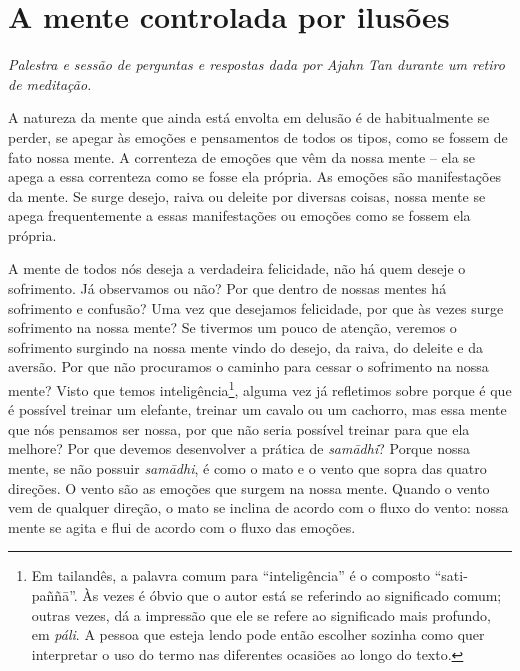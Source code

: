 
\chapter{A mente controlada por ilusões}

{\itshape
Palestra e sessão de perguntas e respostas dada por Ajahn Tan durante um
retiro de meditação.}

A natureza da mente que ainda está envolta em delusão é de
habitualmente se perder, se apegar às emoções e pensamentos de todos os
tipos, como se fossem de fato nossa mente. A correnteza de emoções que
vêm da nossa mente – ela se apega a essa correnteza como se fosse ela
própria. As emoções são manifestações da mente. Se surge desejo, raiva
ou deleite por diversas coisas, nossa mente se apega frequentemente a
essas manifestações ou emoções como se fossem ela própria.

A mente de todos nós deseja a verdadeira felicidade, não há quem
deseje o sofrimento. Já observamos ou não? Por que dentro de nossas
mentes há sofrimento e confusão? Uma vez que desejamos felicidade, por
que às vezes surge sofrimento na nossa mente? Se tivermos um pouco de
atenção, veremos o sofrimento surgindo na nossa mente vindo do desejo,
da raiva, do deleite e da aversão. Por que não procuramos o caminho
para cessar o sofrimento na nossa mente? Visto que temos
inteligência\footnote{Em tailandês, a palavra comum para “inteligência”
é o composto “sati-paññ\=a”. Às vezes é óbvio que o autor está se
referindo ao significado comum; outras vezes, dá a impressão que ele se
refere ao significado mais profundo, em \textit{páli}. A pessoa que
esteja lendo pode então escolher sozinha como quer interpretar o uso do
termo nas diferentes ocasiões ao longo do texto.}, alguma vez já
refletimos sobre porque é que é possível treinar um elefante, treinar
um cavalo ou um cachorro, mas essa mente que nós pensamos ser nossa,
por que não seria possível treinar para que ela melhore? Por que
devemos desenvolver a prática de \textit{sam\=adhi}? Porque nossa
mente, se não possuir \textit{sam\=adhi}, é como o mato e o vento que
sopra das quatro direções. O vento são as emoções que surgem na nossa
mente. Quando o vento vem de qualquer direção, o mato se inclina de
acordo com o fluxo do vento: nossa mente se agita e flui de acordo com
o fluxo das emoções.

